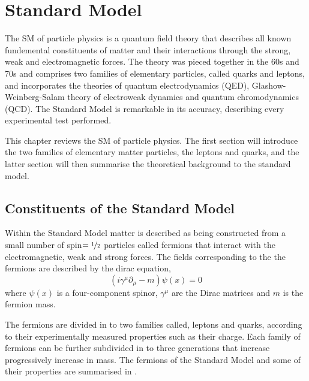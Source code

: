 \chapter{Standard Model}
\label{chap:sm}
The \ac{SM} of particle physics is a quantum field theory that describes all
known fundemental constituents of matter and their interactions through the
strong, weak and electromagnetic forces.
The theory was pieced together in the 60s and 70s and comprises two families of
elementary particles, called quarks and leptons, and incorporates the theories
of quantum electrodynamics (QED), Glashow-Weinberg-Salam theory of electroweak
dynamics and quantum chromodynamics (QCD).
The Standard Model is remarkable in its accuracy, describing every experimental
test performed.  

This chapter reviews the \ac{SM} of particle physics. The first section will 
introduce the two families of elementary matter particles, the leptons and quarks,
 and the latter section will then summarise the theoretical background
to the standard model.



\section{Constituents of the Standard Model}
\label{sec:matter}
Within the Standard Model matter is described as being constructed from a small
number of spin$=\nicefrac{1}{2}$ particles called fermions that interact with
the electromagnetic, weak and strong forces. 
The fields corresponding to the the fermions are described by the dirac
equation,
\begin{equation}
\left( i \gamma^{\mu} \partial_{\mu} - m \right) \psi(x) = 0
\end{equation}
where $\psi(x)$ is a four-component spinor, $\gamma^{\mu}$ are the Dirac
matrices and $m$ is the fermion mass.

The fermions are divided in to two families called, leptons and quarks,
according to their experimentally measured properties such as their charge.
Each family of fermions can be further subdivided in to three generations that
increase progressively increase in mass. The fermions of the Standard Model and
some of their properties are summarised in .

